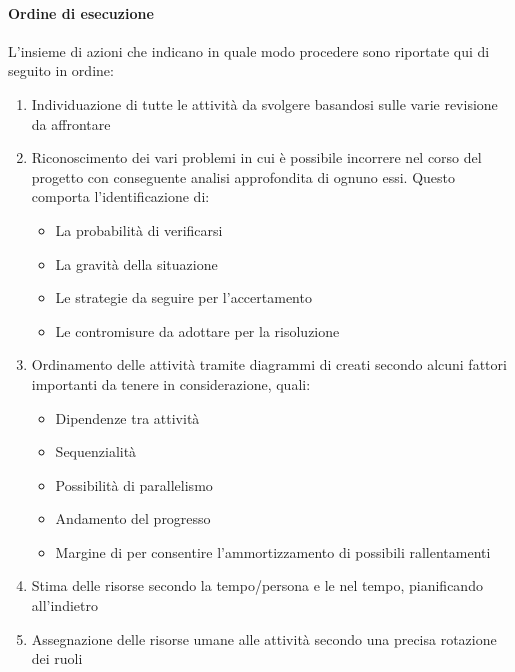 			\paragraph{Ordine di esecuzione}
			L'insieme di azioni che indicano in quale modo procedere sono riportate qui di seguito in ordine:
			\begin{enumerate}
				\item Individuazione di tutte le attività da svolgere basandosi sulle varie revisione da affrontare
				\item Riconoscimento dei vari problemi in cui è possibile incorrere nel corso del progetto con conseguente analisi approfondita di ognuno essi. Questo comporta l'identificazione di:
				\begin{itemize}
					\item La probabilità di verificarsi
					\item La gravità della situazione
					\item Le strategie da seguire per l'accertamento
					\item Le contromisure da adottare per la risoluzione
				\end{itemize}
				\item Ordinamento delle attività tramite diagrammi di  creati secondo alcuni fattori importanti da tenere in considerazione, quali:
				\begin{itemize}
					\item Dipendenze tra attività
					\item Sequenzialità
					\item Possibilità di parallelismo
					\item Andamento del progresso
					\item Margine di  per consentire l'ammortizzamento di possibili rallentamenti
				\end{itemize}
			\item Stima delle risorse secondo la  tempo/persona e le  nel tempo, pianificando all'indietro
			\item Assegnazione delle risorse umane alle attività secondo una precisa rotazione dei ruoli
			\end{enumerate}

